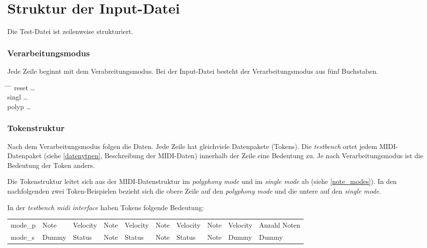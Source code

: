 \section{Struktur der Input-Datei}\label{sec.testbench_inputdatei} 

Die Test-Datei ist zeilenweise strukturiert.

\subsubsection{Verarbeitungsmodus} 
Jede Zeile beginnt mit dem Verabreitungsmodus. Bei der Input-Datei besteht der Verarbeitungsmodus aus fünf Buchstaben.

\begin{tabbing}
\hspace{4em} \= \hspace{2em} \= \hspace{2em} \=\kill
reset	  \> \ldots{}\\
singl	  \> \ldots{}\\
polyp	  \> \ldots{}
\end{tabbing}

\subsubsection{Tokenstruktur} 

Nach dem Verarbeitungsmodus folgen die Daten. Jede Zeile hat gleichviele Datenpakete (Tokens). 
Die \textit{testbench} ortet jedem MIDI-Datenpaket (siehe \ref {datenytpen}, Beschreibung der MIDI-Daten) innerhalb der Zeile eine Bedeutung zu. Je nach Verarbeitungsmodus ist die Bedeutung der Token anders.

Die Tokenstruktur leitet sich aus der MIDI-Datenstruktur im \textit{polyphony mode} und im \textit{single mode} ab (siehe  \ref{note_modes}). In den nachfolgenden zwei Token-Beispielen bezieht sich die obere Zeile auf den \textit{polyphony mode} und die untere auf den \textit{single mode}.

In der \textit{testbench midi interface} haben Tokens folgende Bedeutung:


{
\renewcommand{\arraystretch}{1.0} %
\begin{tabular}{@{}*{10}{l}@{}} %
mode\_p	& Note & Velocity	& Note & Velocity & Note & Velocity & Note & Velocity & Anzahl Noten \\
mode\_s	& Dummy & Status & Note & Status & Note & Status & Note & Dummy & Dummy
\end{tabular}
}


